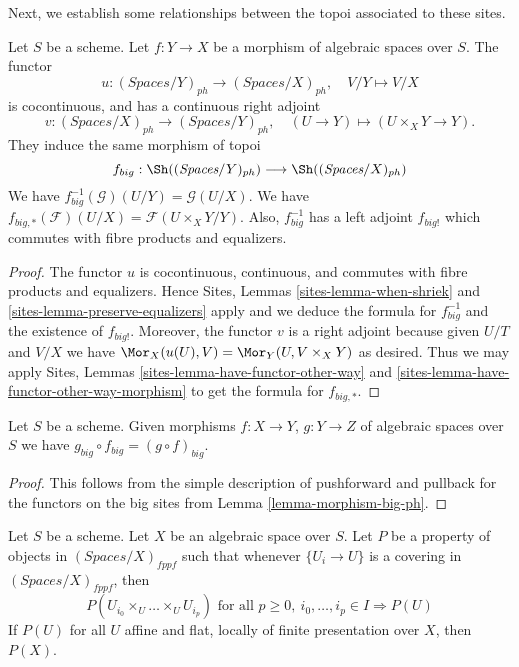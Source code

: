 \noindent
Next, we establish some relationships between the topoi
associated to these sites.

\begin{lemma}
\label{lemma-morphism-big-ph}
Let $S$ be a scheme.
Let $f : Y \to X$ be a morphism of algebraic spaces over $S$.
The functor
$$
u : (\textit{Spaces}/Y)_{ph} \longrightarrow (\textit{Spaces}/X)_{ph},
\quad
V/Y \longmapsto V/X
$$
is cocontinuous, and has a continuous right adjoint
$$
v : (\textit{Spaces}/X)_{ph} \longrightarrow (\textit{Spaces}/Y)_{ph},
\quad
(U \to Y) \longmapsto (U \times_X Y \to Y).
$$
They induce the same morphism of topoi
$$
f_{big} :
\Sh((\textit{Spaces}/Y)_{ph})
\longrightarrow
\Sh((\textit{Spaces}/X)_{ph})
$$
We have $f_{big}^{-1}(\mathcal{G})(U/Y) = \mathcal{G}(U/X)$.
We have $f_{big, *}(\mathcal{F})(U/X) = \mathcal{F}(U \times_X Y/Y)$.
Also, $f_{big}^{-1}$ has a left adjoint $f_{big!}$ which commutes with
fibre products and equalizers.
\end{lemma}

\begin{proof}
The functor $u$ is cocontinuous, continuous, and commutes with fibre products
and equalizers. Hence
Sites, Lemmas \ref{sites-lemma-when-shriek} and
\ref{sites-lemma-preserve-equalizers}
apply and we deduce the formula
for $f_{big}^{-1}$ and the existence of $f_{big!}$. Moreover,
the functor $v$ is a right adjoint because given $U/T$ and $V/X$
we have $\Mor_X(u(U), V) = \Mor_Y(U, V \times_X Y)$
as desired. Thus we may apply
Sites, Lemmas \ref{sites-lemma-have-functor-other-way} and
\ref{sites-lemma-have-functor-other-way-morphism} to get the
formula for $f_{big, *}$.
\end{proof}

\begin{lemma}
\label{lemma-composition-ph}
Let $S$ be a scheme. Given morphisms $f : X \to Y$, $g : Y \to Z$
of algebraic spaces over $S$ we have
$g_{big} \circ f_{big} = (g \circ f)_{big}$.
\end{lemma}

\begin{proof}
This follows from the simple description of pushforward
and pullback for the functors on the big sites from
Lemma \ref{lemma-morphism-big-ph}.
\end{proof}

\begin{lemma}
\label{lemma-cech-enough}
Let $S$ be a scheme. Let $X$ be an algebraic space over $S$.
Let $P$ be a property of objects in $(\textit{Spaces}/X)_{fppf}$
such that whenever $\{U_i \to U\}$ is a covering in
$(\textit{Spaces}/X)_{fppf}$, then
$$
P(U_{i_0} \times_U \ldots \times_U U_{i_p})
\text{ for all }
p \geq 0,\ i_0, \ldots, i_p \in I
\Rightarrow P(U)
$$
If $P(U)$ for all $U$ affine and flat, locally of finite presentation over $X$,
then $P(X)$.
\end{lemma}

